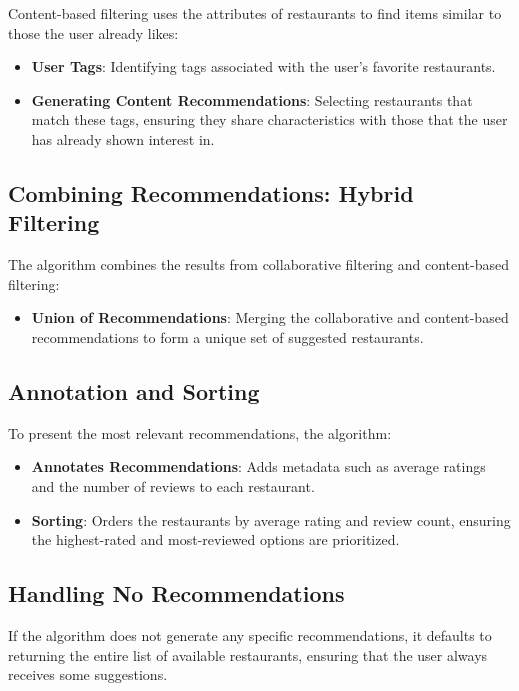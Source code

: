 \documentclass[12pt, a4paper, oneside]{article}
\begin{document}
Content-based filtering uses the attributes of restaurants to find items similar to those the user already likes:
\begin{itemize}
    \item \textbf{User Tags}: Identifying tags associated with the user’s favorite restaurants.
    \item \textbf{Generating Content Recommendations}: Selecting restaurants that match these tags, ensuring they share characteristics with those that the user has already shown interest in.
\end{itemize}

\subsection{Combining Recommendations: Hybrid Filtering}

The algorithm combines the results from collaborative filtering and content-based filtering:
\begin{itemize}
    \item \textbf{Union of Recommendations}: Merging the collaborative and content-based recommendations to form a unique set of suggested restaurants.
\end{itemize}

\subsection{Annotation and Sorting}

To present the most relevant recommendations, the algorithm:
\begin{itemize}
    \item \textbf{Annotates Recommendations}: Adds metadata such as average ratings and the number of reviews to each restaurant.
    \item \textbf{Sorting}: Orders the restaurants by average rating and review count, ensuring the highest-rated and most-reviewed options are prioritized.
\end{itemize}

\subsection{Handling No Recommendations}

If the algorithm does not generate any specific recommendations, it defaults to returning the entire list of available restaurants, ensuring that the user always receives some suggestions.
\end{document}
